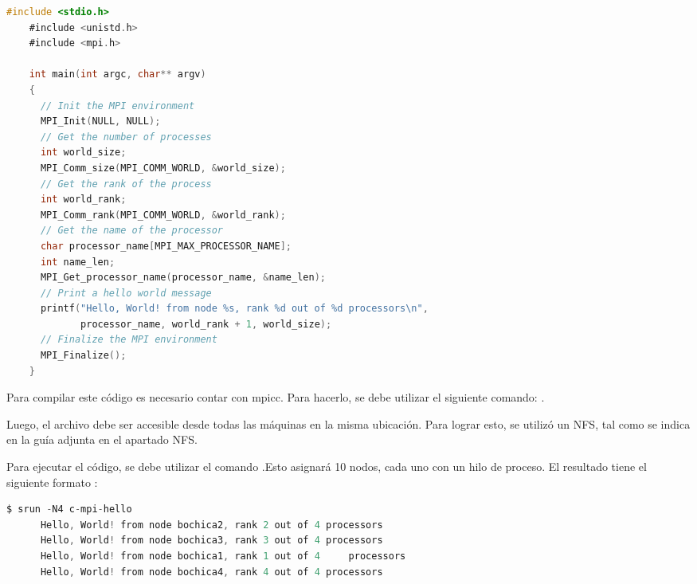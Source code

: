 \begin{spacing}{1.5}

  \begin{lstlisting}[language=C]
    #include <stdio.h>
    #include <unistd.h>
    #include <mpi.h>
    
    int main(int argc, char** argv)
    {
      // Init the MPI environment
      MPI_Init(NULL, NULL);
      // Get the number of processes
      int world_size;
      MPI_Comm_size(MPI_COMM_WORLD, &world_size);
      // Get the rank of the process
      int world_rank;
      MPI_Comm_rank(MPI_COMM_WORLD, &world_rank);
      // Get the name of the processor
      char processor_name[MPI_MAX_PROCESSOR_NAME];
      int name_len;
      MPI_Get_processor_name(processor_name, &name_len);
      // Print a hello world message
      printf("Hello, World! from node %s, rank %d out of %d processors\n",
             processor_name, world_rank + 1, world_size);
      // Finalize the MPI environment
      MPI_Finalize();
    }
    \end{lstlisting}

  Para compilar este código es necesario contar con mpicc. Para hacerlo, se
  debe utilizar el siguiente comando: .

  Luego, el archivo debe ser accesible desde todas las máquinas en la misma
  ubicación. Para lograr esto, se utilizó un NFS, tal como se indica en la guía
  adjunta en el apartado NFS.

  Para ejecutar el código, se debe utilizar el comando .Esto asignará 10 nodos, cada uno con un hilo de proceso. El resultado tiene el siguiente formato :

    \begin{lstlisting}[language=C]
      $ srun -N4 c-mpi-hello
      Hello, World! from node bochica2, rank 2 out of 4 processors
      Hello, World! from node bochica3, rank 3 out of 4 processors
      Hello, World! from node bochica1, rank 1 out of 4     processors
      Hello, World! from node bochica4, rank 4 out of 4 processors
    \end{lstlisting}


\end{spacing}
